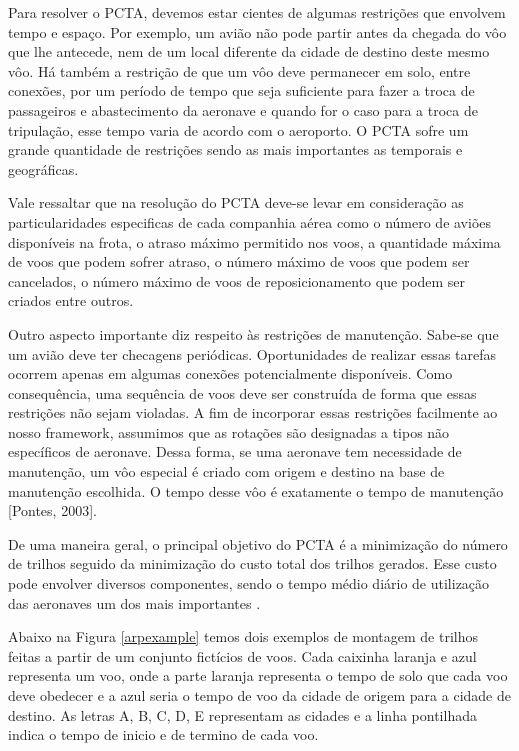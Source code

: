 	Para resolver o PCTA, devemos estar cientes de algumas restrições que envolvem tempo e espaço. Por exemplo, um avião não pode partir antes da chegada do vôo que lhe antecede, nem de um local diferente da cidade de destino deste mesmo vôo. Há também a restrição de que um vôo deve permanecer em solo, entre conexões, por um período de tempo que seja suficiente para fazer a troca de passageiros e abastecimento da aeronave e quando for o caso para a troca de tripulação, esse tempo varia de acordo com o aeroporto. O PCTA sofre um grande quantidade de restrições sendo as mais importantes as temporais e geográficas.
 
	Vale ressaltar que na resolução do PCTA deve-se levar em consideração as particularidades especificas de cada companhia aérea como o número de aviões disponíveis na frota, o atraso máximo permitido nos voos, a quantidade máxima de voos que podem sofrer atraso, o número máximo de voos que podem ser cancelados, o número máximo de voos de reposicionamento que podem ser criados entre outros.
 
	Outro aspecto importante diz respeito às restrições de manutenção. Sabe-se que um avião deve ter checagens periódicas. Oportunidades de realizar essas tarefas ocorrem apenas em algumas conexões potencialmente disponíveis. Como consequência, uma sequência de voos deve ser construída de forma que essas restrições não sejam violadas. A fim de incorporar essas restrições facilmente ao nosso framework, assumimos que as rotações são designadas a tipos não específicos de aeronave. Dessa forma, se uma aeronave tem necessidade de manutenção, um vôo especial é criado com origem e destino na base de manutenção escolhida. O tempo desse vôo é exatamente o tempo de manutenção [Pontes, 2003].
 
	De uma maneira geral, o principal objetivo do PCTA é a minimização do número de trilhos seguido da minimização do custo total dos trilhos gerados. Esse custo pode envolver diversos componentes, sendo o tempo médio diário de utilização das aeronaves um dos mais importantes \citep{abiliolivro}.
 
	Abaixo na Figura \ref{arpexample} temos dois exemplos de montagem de trilhos feitas a partir de um conjunto fictícios de voos. Cada caixinha laranja e azul representa um voo, onde a parte laranja representa o tempo de solo que cada voo deve obedecer e a azul seria o tempo de voo da cidade de origem para a cidade de destino. As letras A, B, C, D, E representam as cidades e a linha pontilhada indica o tempo de inicio e de termino de cada voo.

